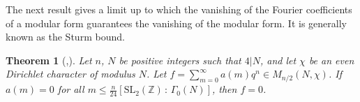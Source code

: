 \documentclass[11pt,a4paper]{amsart}
\newtheorem{theorem}{Theorem}[section]
\theoremstyle{definition}
\newcommand{\SZ}{\mathbb{Z}}                    %
\begin{document}
The next result gives a limit up to which the vanishing of the Fourier coefficients of a modular form guarantees the vanishing of the modular form. It is generally known as the Sturm bound. %
\begin{theorem}[{\cite[Theorem 1]{sturm1987congruence},\cite[Lemma 3.1]{kumar2014note}}]
\label{thm:sturmbound}
Let $n$, $N$ be positive integers such that $4|N$, and let $\chi$ be an even Dirichlet character of modulus $N$. Let $f=\sum_{m=0}^{\infty} a(m)q^n \in M_{n/2}(N,\chi)$. If $a(m)=0$ for all $m \leq \frac{n}{24} [\mathrm{SL}_2(\SZ) \, : \, \Gamma_0(N) ]$, then $f=0$.
\end{theorem}
\begin{comment}
\begin{proof} If $k$ is even, then the statement follows from the standard version of the Sturm bound \cite[Theorem 1]{sturm1987congruence}.
	
Suppose that $k$ is odd and set $B=\frac{k}{24} [\mathrm{SL}_2(\SZ) \, : \, \Gamma(N) ]$. Since $a_f(n)=0$ for $n \leq B$, the Fourier expansion of $f$ at $\infty$ can be written as
\[ f=q^{B+1}(a_f(B+2)+a_f(B+2)q+dots). \]
The function $f^4 \in M_{2k}(\Gamma(N))$ is an integral weight modular form. The Fourier expansion of $f^4$ at $\infty$ looks as
\[ f^4 = q^4(B+1) \left( sum_{n=0}^{\infty} c_n q^n \right) \]
where $c_n$ is in terms of $a_f(i)$ for $i \leq n$. Since the Fourier coefficients of $f^4$ are zero up to $4B = \frac{2k}{12}[\mathrm{SL}_2(\SZ) \, : \, \Gamma(N) ]$, the even case above implies that $f^4=0$. This implies that $f=0$, which proves the lemma. 
\end{proof}
ISSUES: 
1. The multiplier system of the eta function is NOT a Dirichlet character (of the element d), i.e. a homomorphism from SL\_2 but instead its associated with the metaplectic group, the double cover of SL\_2. Solution: scale up both the eta product and the theta function a la Gordon and Sinor
2. The theta function is a priori modular for Gamma(n). We need modularity for Gamma\_0(n) or at least for  Gamma\_1(n). And the characters also need to agree.
\end{comment}
\end{document}
